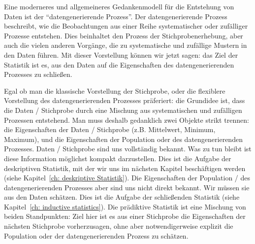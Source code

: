 \documentclass[a4paper,twoside]{tufte-book}\usepackage[]{graphicx}\usepackage[]{color}
\begin{document}
	
	Eine moderneres und allgemeineres Gedankenmodell für die Entstehung von Daten ist der "`datengenerierende Prozess"'. Der datengenerierende Prozess beschreibt, wie die Beobachtungen aus einer Reihe systematischer oder zufälliger Prozesse entstehen. Dies beinhaltet den Prozess der Stichprobenerhebung, aber auch die vielen anderen Vorgänge, die zu systematische und zufällige Mustern in den Daten führen. Mit dieser Vorstellung können wir jetzt sagen: das Ziel der Statistik ist es, aus den Daten auf die Eigenschaften des datengenerierenden Prozesses zu schließen. 
	
	Egal ob man die klassische Vorstellung der Stichprobe, oder die flexiblere Vorstellung des datengenerierenden Prozesses präferiert: die Grundidee ist, dass die Daten / Stichprobe durch eine Mischung aus systematischen und zufälligen Prozessen entstehend. Man muss deshalb gedanklich zwei Objekte strikt trennen: die Eigenschaften der Daten / Stichprobe (z.B. Mittelwert, Minimum, Maximum), und die Eigenschaften der Population oder des datengenerierenden Prozesses. Daten / Stichprobe sind uns vollständig bekannt. Was zu tun bleibt ist diese Information möglichst kompakt darzustellen. Dies ist die Aufgabe der deskriptiven Statistik, mit der wir uns im nächsten Kapitel beschäftigen werden (siehe Kapitel~\ref{ch: deskriptive Statistik}). Die Eigenschaften der Population / des datengenerierenden Prozesses aber sind uns nicht direkt bekannt. Wir müssen sie aus den Daten schätzen. Dies ist die Aufgabe der schließenden Statistik (siehe Kapitel~\ref{ch: inductive statistics}). Die prädiktive Statistik ist eine Mischung von beiden Standpunkten: Ziel hier ist es aus einer Stichprobe die Eigenschaften der nächsten Stichprobe vorherzusagen, ohne aber notwendigerweise explizit die Population oder der datengenerierenden Prozess zu schätzen. 
	
\end{document}
